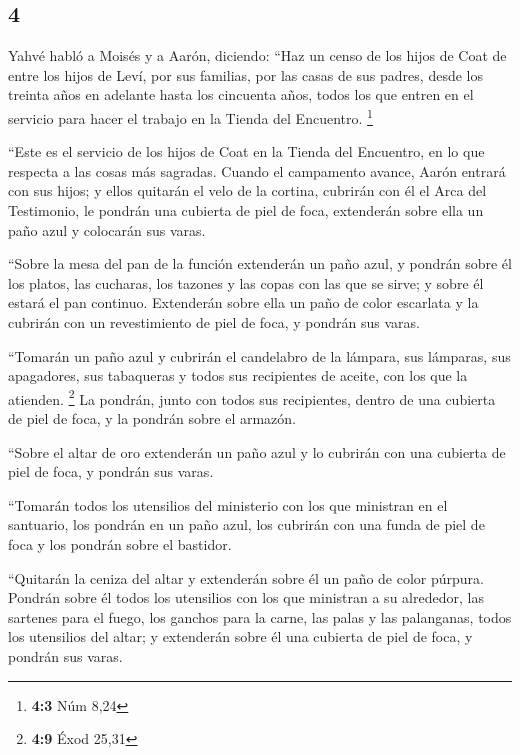 \begin{paracol}{2}
\hypertarget{section-6}{%
\section{4}\label{section-6}}

 Yahvé habló a Moisés y a Aarón, diciendo: 
``Haz un censo de los hijos de Coat de entre los hijos de Leví, por sus
familias, por las casas de sus padres,  desde los treinta
años en adelante hasta los cincuenta años, todos los que entren en el
servicio para hacer el trabajo en la Tienda del Encuentro. \footnote{\textbf{4:3}
  Núm 8,24}

 ``Este es el servicio de los hijos de Coat en la Tienda
del Encuentro, en lo que respecta a las cosas más sagradas.
 Cuando el campamento avance, Aarón entrará con sus hijos;
y ellos quitarán el velo de la cortina, cubrirán con él el Arca del
Testimonio,  le pondrán una cubierta de piel de foca,
extenderán sobre ella un paño azul y colocarán sus varas.

 ``Sobre la mesa del pan de la función extenderán un paño
azul, y pondrán sobre él los platos, las cucharas, los tazones y las
copas con las que se sirve; y sobre él estará el pan continuo.
 Extenderán sobre ella un paño de color escarlata y la
cubrirán con un revestimiento de piel de foca, y pondrán sus varas.

 ``Tomarán un paño azul y cubrirán el candelabro de la
lámpara, sus lámparas, sus apagadores, sus tabaqueras y todos sus
recipientes de aceite, con los que la atienden. \footnote{\textbf{4:9}
  Éxod 25,31}  La pondrán, junto con todos sus
recipientes, dentro de una cubierta de piel de foca, y la pondrán sobre
el armazón.

 ``Sobre el altar de oro extenderán un paño azul y lo
cubrirán con una cubierta de piel de foca, y pondrán sus varas.

 ``Tomarán todos los utensilios del ministerio con los
que ministran en el santuario, los pondrán en un paño azul, los cubrirán
con una funda de piel de foca y los pondrán sobre el bastidor.

 ``Quitarán la ceniza del altar y extenderán sobre él un
paño de color púrpura.  Pondrán sobre él todos los
utensilios con los que ministran a su alrededor, las sartenes para el
fuego, los ganchos para la carne, las palas y las palanganas, todos los
utensilios del altar; y extenderán sobre él una cubierta de piel de
foca, y pondrán sus varas.


\end{paracol}
